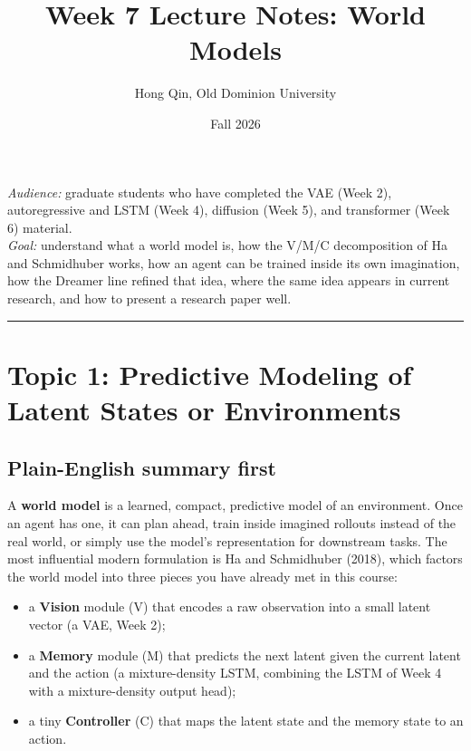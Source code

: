\documentclass[11pt]{article}
\title{Week 7 Lecture Notes: World Models}
\author{Hong Qin, Old Dominion University}
\date{Fall 2026}
\theoremstyle{remark}
\begin{document}
\maketitle

\begin{center}
\textit{Audience:} graduate students who have completed the VAE (Week 2), autoregressive and LSTM (Week 4), diffusion (Week 5), and transformer (Week 6) material.\\
\textit{Goal:} understand what a world model is, how the V/M/C decomposition of Ha and Schmidhuber works, how an agent can be trained inside its own imagination, how the Dreamer line refined that idea, where the same idea appears in current research, and how to present a research paper well.
\end{center}

\tableofcontents
\bigskip
\hrule
\bigskip

\section{Topic 1: Predictive Modeling of Latent States or Environments}

\subsection*{Plain-English summary first}

A \textbf{world model} is a learned, compact, predictive model of an environment. Once an agent has one, it can plan ahead, train inside imagined rollouts instead of the real world, or simply use the model's representation for downstream tasks. The most influential modern formulation is Ha and Schmidhuber (2018), which factors the world model into three pieces you have already met in this course:

\begin{itemize}[leftmargin=1.4em]
  \item a \textbf{Vision} module (V) that encodes a raw observation into a small latent vector (a VAE, Week 2);
  \item a \textbf{Memory} module (M) that predicts the next latent given the current latent and the action (a mixture-density LSTM, combining the LSTM of Week 4 with a mixture-density output head);
  \item a tiny \textbf{Controller} (C) that maps the latent state and the memory state to an action.
\end{itemize}
\end{document}
